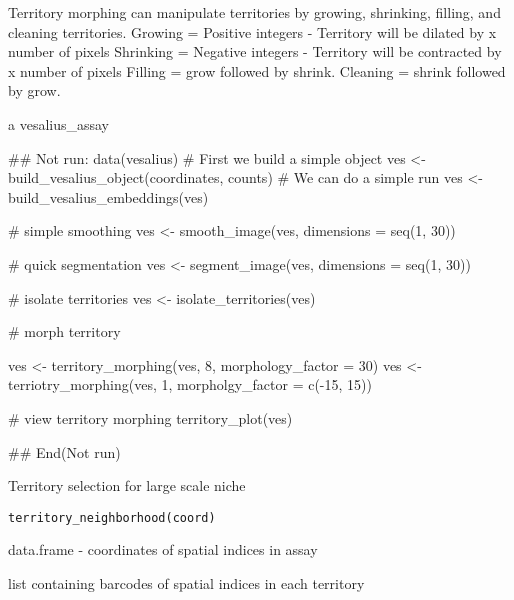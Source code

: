 \documentclass[a4paper]{book}
\begin{document}
%
\begin{Details}
Territory morphing can manipulate territories by growing, shrinking,
filling, and cleaning territories.
Growing = Positive integers - Territory will be dilated by x number of pixels
Shrinking = Negative integers - Territory will be contracted by x number of
pixels
Filling = grow followed by shrink.
Cleaning = shrink followed by grow.
\end{Details}
%
\begin{Value}
a vesalius\_assay
\end{Value}
%
\begin{Examples}
\begin{ExampleCode}
## Not run: 
data(vesalius)
# First we build a simple object
ves <- build_vesalius_object(coordinates, counts)
# We can do a simple run
ves <- build_vesalius_embeddings(ves)

# simple smoothing
ves <- smooth_image(ves, dimensions = seq(1, 30))

# quick segmentation
ves <- segment_image(ves, dimensions = seq(1, 30))

# isolate territories
ves <- isolate_territories(ves)

# morph territory

ves <- territory_morphing(ves, 8, morphology_factor = 30)
ves <- terriotry_morphing(ves, 1, morpholgy_factor = c(-15, 15))

# view territory morphing
territory_plot(ves)

## End(Not run)
\end{ExampleCode}
\end{Examples}
%
\begin{Description}
Territory selection for large scale niche
\end{Description}
%
\begin{Usage}
\begin{verbatim}
territory_neighborhood(coord)
\end{verbatim}
\end{Usage}
%
\begin{Arguments}
\begin{ldescription}
\item[\code{coord}] data.frame - coordinates of spatial indices in assay
\end{ldescription}
\end{Arguments}
%
\begin{Value}
list containing barcodes of spatial indices in each territory
\end{Value}
\end{document}
